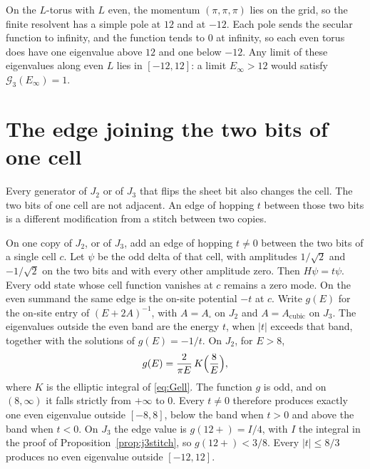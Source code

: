 On the \(L\)-torus with \(L\) even, the momentum \((\pi,\pi,\pi)\) lies on
the grid, so the finite resolvent has a simple pole at \(12\) and at \(-12\).
Each pole sends the secular function to infinity, and the function tends
to \(0\) at infinity, so each even torus does have one eigenvalue above
\(12\) and one below \(-12\).
Any limit of these eigenvalues along even \(L\) lies in \([-12,12]\):
a limit \(E_\infty>12\) would satisfy \(\mathcal{G}_3(E_\infty)=1\).

\section{The edge joining the two bits of one cell}
\label{sec:rung}

Every generator of \(J_2\) or of \(J_3\) that flips the sheet bit also changes
the cell.
The two bits of one cell are not adjacent.
An edge of hopping \(t\) between those two bits is a different modification
from a stitch between two copies.

\begin{proposition}
\label{prop:rung}
On one copy of \(J_2\), or of \(J_3\), add an edge of hopping \(t\neq 0\)
between the two bits of a single cell \(c\).
Let \(\psi\) be the odd delta of that cell, with amplitudes
\(1/\sqrt{2}\) and \(-1/\sqrt{2}\) on the two bits and with every other
amplitude zero.
Then \(H\psi=t\psi\).
Every odd state whose cell function vanishes at \(c\) remains a zero mode.
On the even summand the same edge is the on-site potential \(-t\) at \(c\).
Write \(g(E)\) for the on-site entry of \((E+2A)^{-1}\), with
\(A=A_\square\) on \(J_2\) and \(A=A_{\mathrm{cubic}}\) on \(J_3\).
The eigenvalues outside the even band are the energy \(t\), when \(|t|\)
exceeds that band, together with the solutions of \(g(E)=-1/t\).
On \(J_2\), for \(E>8\),
\begin{equation}
\label{eq:rungG}
g(E)=\frac{2}{\pi E}\,K\Bigl(\frac{8}{E}\Bigr),
\end{equation}
where \(K\) is the elliptic integral of \eqref{eq:Gell}.
The function \(g\) is odd, and on \((8,\infty)\) it falls strictly from
\(+\infty\) to \(0\).
Every \(t\neq 0\) therefore produces exactly one even eigenvalue outside
\([-8,8]\), below the band when \(t>0\) and above the band when \(t<0\).
On \(J_3\) the edge value is \(g(12+)=I/4\), with \(I\) the integral in the
proof of Proposition~\ref{prop:j3stitch}, so \(g(12+)<3/8\).
Every \(|t|\le 8/3\) produces no even eigenvalue outside \([-12,12]\).
\end{proposition}

